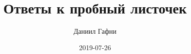 \documentclass{article}%
\title{Ответы к пробный листочек}%
\author{Даниил Гафни}%
\date{2019{-}07{-}26}%
\begin{document}
%
\normalsize%
\maketitle%
\end{document}

